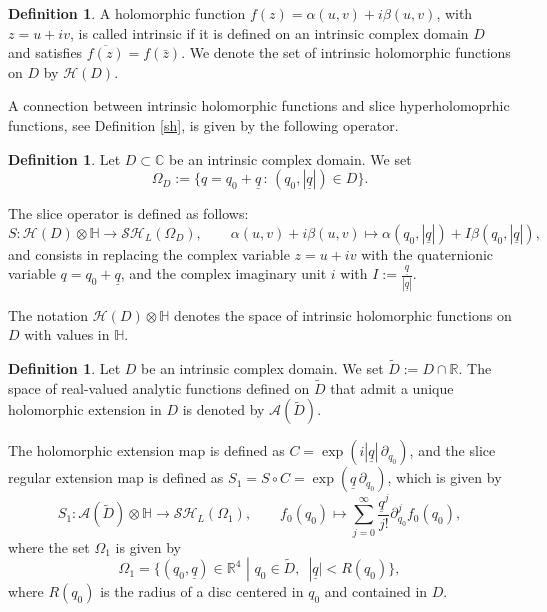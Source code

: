 \documentclass[reqno,11pt]{amsart}
\numberwithin{equation}{section}
\theoremstyle{definition}
\newtheorem{definition}[theorem]{Definition}
\begin{document}
\begin{definition}
	A holomorphic function $f(z)=\alpha(u,v)+i\beta(u,v)$, with $z=u+iv$, is called intrinsic if it is defined on an intrinsic complex domain $D$ and satisfies $\overline{f(z)}=f(\bar{z})$. We denote the set of intrinsic holomorphic functions on $D$ by $\mathcal{H}(D)$.
\end{definition}


A connection between intrinsic holomorphic functions and slice hyperholomoprhic functions, see Definition \ref{sh}, is given by the following operator.

\begin{definition}
Let $D \subset \mathbb{C}$ be an intrinsic complex domain. We set
\begin{equation}
\label{omega}
	\Omega_D:= \{q=q_0+\underline{q} \, : \, (q_0, | \underline{q}|) \in D\}.
\end{equation}

The slice operator is defined as follows:
\begin{equation}
	\label{slice1}
	S: \mathcal{H}(D) \otimes \mathbb{H} \to \mathcal{SH}_L(\Omega_D),
	\qquad
	\alpha(u,v)+i \beta(u,v) \mapsto \alpha(q_0, |\underline{q}|)+I\beta(q_0, |\underline{q}|),
\end{equation}
and consists in replacing the complex variable $z=u+iv$ with the quaternionic variable $q=q_0+\underline{q}$, and the complex imaginary unit $i$ with $I:= \frac{\underline{q}}{|\underline{q}|}$.

The notation $\mathcal{H}(D) \otimes \mathbb{H}$ denotes the space of intrinsic holomorphic functions on $D$ with values in $\mathbb{H}$.
\end{definition}




\begin{definition}
\label{analy}
	Let $D$ be an intrinsic complex domain. We set $\tilde{D}:=D \cap \mathbb{R}$. The space of real-valued analytic functions defined on $\tilde{D}$ that admit a unique holomorphic extension in $D$ is denoted by $\mathcal{A}(\tilde{D})$.
\end{definition}


The holomorphic extension map is defined as $C=\exp(i|\underline{q}|\,\partial_{q_0})$, and the slice regular extension map is defined as $S_1=S \circ C=\exp(\underline{q}\,\partial_{q_0})$, which is given by
\begin{equation}
	\label{regex}
	S_1: \mathcal{A}(\tilde{D}) \otimes \mathbb{H} \to \mathcal{SH}_L(\Omega_1), \qquad f_0(q_0) \mapsto \sum_{j=0}^{\infty} \frac{\underline{q}^j}{j!} \partial_{q_0}^j f_0(q_0),
\end{equation}
where the set $\Omega_1$ is given by
\begin{equation*}
	\Omega_1=  \{(q_0, \underline{q}) \in \mathbb{R}^4 \, \, |\, \, q_0 \in \tilde{D}, \, \, \, |\underline{q}|< R(q_0)\},
\end{equation*}
where $R(q_0)$ is the radius of a disc centered in $q_0$ and contained in $D$.
\end{document}
